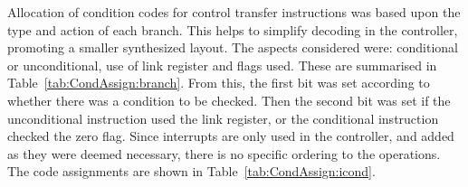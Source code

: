 Allocation of condition codes for control transfer instructions was based upon the type and action of each branch. This helps to simplify decoding in the controller, promoting a smaller synthesized layout. 
The aspects considered were: conditional or unconditional, use of link register and flags used. 
These are summarised in Table~\ref{tab:CondAssign:branch}. 
From this, the first bit was set according to whether there was a condition to be checked. 
Then the second bit was set if the unconditional instruction used the link register, or the conditional instruction checked the zero flag. 
Since interrupts are only used in the controller, and added as they were deemed necessary, there is no specific ordering to the operations. 
The code assignments are shown in Table~\ref{tab:CondAssign:icond}. 

\begin{table}[h!]
\def\arraystretch{1.2}
\centering
\footnotesize
{}
\caption{Condition Code Assignments}
\label{tab:CondAssign}
\end{table}
